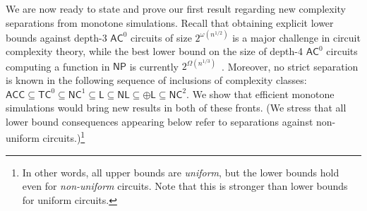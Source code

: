 \documentclass[10pt,a4paper]{article}
\newcommand{\complexityfont}[1]{\mathsf{#1}}
\def\TC           {\complexityfont{TC}}
\newcommand\NL           {\complexityfont{NL}}
\def\NP           {\complexityfont{NP}}
\def\AC           {\complexityfont{AC}}
\def\pL           {\oplus\complexityfont{L}}
\def\ACC          {\complexityfont{ACC}}
\def\NC           {\complexityfont{NC}}
\renewcommand{\L} {\complexityfont{L}}
\def\sseq{\subseteq}
\begin{document}
We are now ready to state and prove our first result regarding
new complexity separations from monotone simulations. Recall that obtaining explicit lower bounds against depth-$3$ $\AC^0$  circuits of size $2^{\omega(n^{1/2})}$ is a major challenge in circuit complexity theory, while the best lower bound on the size of depth-4 $\AC^0$ circuits
computing a function in $\NP$ is
currently $2^{\Omega(n^{1/3})}$~\cite{DBLP:conf/stoc/Hastad86}.
Moreover, no strict separation is known in the following sequence of inclusions
of complexity classes:
$\ACC \sseq \TC^0 \sseq \NC^1 \sseq \L \sseq \NL \sseq \pL \sseq \NC^2$.
We show that 
efficient monotone simulations would bring new results in both of these
fronts. 
(We stress that all lower bound consequences appearing below refer to
separations against non-uniform circuits.)\footnote{In other words, all upper bounds are
\emph{uniform}, but the lower bounds hold even for \emph{non-uniform}
circuits. Note that this is stronger than lower bounds for uniform
circuits.}
 
\end{document}
